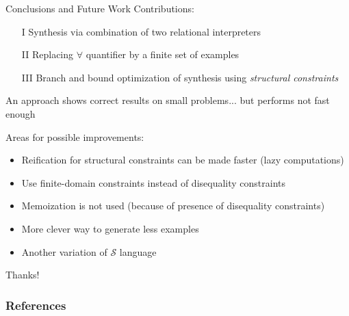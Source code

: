 \documentclass[aspectratio=169
  , xcolor={svgnames}
  , hyperref={ colorlinks,citecolor=Blue
             , linkcolor=DarkRed,urlcolor=DarkBlue}
  , russian
  ]{beamer}
\newcommand{\ir}{\ensuremath{\mathcal{S}}}
\newcommand{\contributions}{
\begin{enumerate}
\item[I] Synthesis via combination of two relational interpreters
\item[II] Replacing $\forall$ quantifier by a finite set of examples
\item[III] Branch and bound optimization of synthesis using \emph{structural constraints}
\end{enumerate}
}
\begin{document}
\begin{frame}{Conclusions and Future Work}
Contributions: \contributions
\vspace{1em}

An approach shows correct results on small problems...
 but performs not fast enough\\
\vspace{1em}
 
Areas for possible improvements:
\begin{itemize}
\item Reification for structural constraints can be made faster (lazy computations)
\item Use finite-domain constraints instead of disequality constraints 
\item Memoization is not used (because of presence of disequality constraints)
\item More clever way to generate less examples
\item Another variation of \ir{} language
\end{itemize}
\vspace{1em}\pause
\begin{center}
{\Huge Thanks!}
\end{center}
\end{frame}



\begin{frame}%
\frametitle{References}


\vspace{1cm}
\end{frame}
\end{document}
